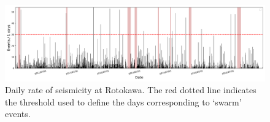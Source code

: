 \begin{figure}[h!]
\begin{center}
\includegraphics[width=0.98\columnwidth]{Chapter_4_Rot/figures/Rot_dets_rate_swarms/Rot_dets_rate_swarms_thresh_30_w_shutdowns_original}
\caption{{Daily rate of seismicity at Rotokawa. The red dotted line indicates the
threshold used to define the days corresponding to `swarm' events.
{\label{754214}}%
}}
\end{center}
\end{figure}

